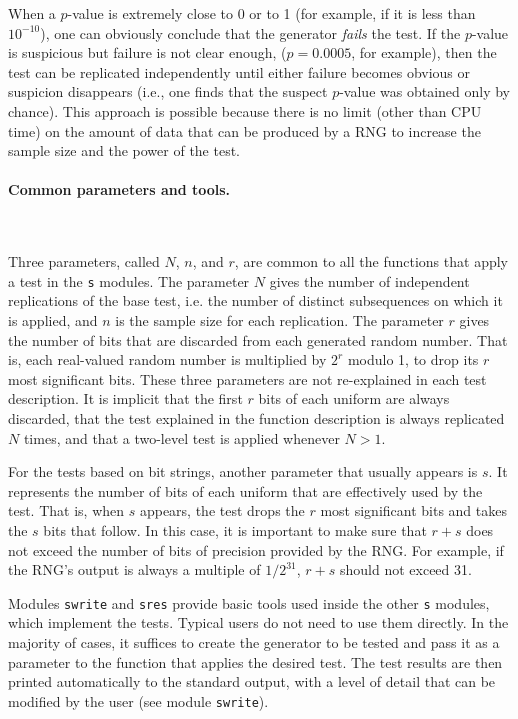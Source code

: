 When a $p$-value is extremely close to 0 or to 1 (for example,
if it is less than $10^{-10}$), one can obviously conclude that
the generator {\em fails\/} the test.
If the $p$-value is suspicious but failure is not clear enough,
($p=0.0005$, for example), then the test can be replicated independently 
until either failure becomes obvious or suspicion disappears 
(i.e., one finds that the suspect $p$-value was obtained only by chance).
This approach is possible because there is no limit (other than CPU time)
on the amount of data that can be produced by a RNG to increase the
sample size and the power of the test.

\paragraph*{Common parameters and tools.} \

Three parameters, called $N$, $n$, and $r$, are common to all the
functions that apply a test in the {\tt s} modules.
The parameter $N$ gives the number of independent replications of the 
base test, i.e. the number of distinct subsequences on which it is applied,
and $n$ is the sample size for each replication.
The parameter $r$ gives the number of bits that are discarded
from each generated random number.  
That is, each real-valued random number is multiplied by $2^r$ modulo 1,
to drop its $r$ most significant bits.
These three parameters are not re-explained in each test description.
It is implicit that the first $r$ bits of each uniform are always
discarded, that the test explained in the function description 
is always replicated $N$ times, and that a two-level test is applied
whenever $N > 1$.

For the tests based on bit strings, another parameter that usually 
appears is $s$.  It represents the number
of bits of each uniform that are effectively used by the test.
That is, when $s$ appears, the test drops the $r$ most significant bits
and takes the $s$ bits that follow.
In this case, it is important to make sure that $r+s$ does not exceed
the number of bits of precision provided by the RNG.
For example, if the RNG's output is always a multiple of $1/2^{31}$,
$r+s$ should not exceed 31.

\ifdetailed  %
Modules {\tt swrite} and  {\tt sres}
provide basic tools used inside the other
{\tt s} modules, which implement the tests.
Typical users do not need to use them directly.
In the majority of cases, it suffices to create the generator
to be tested and pass it as a parameter to
the function that applies the desired test.
The test results are then printed automatically
to the standard output, with a level of detail that can be modified
by the user (see module {\tt swrite}).
\fi  %

